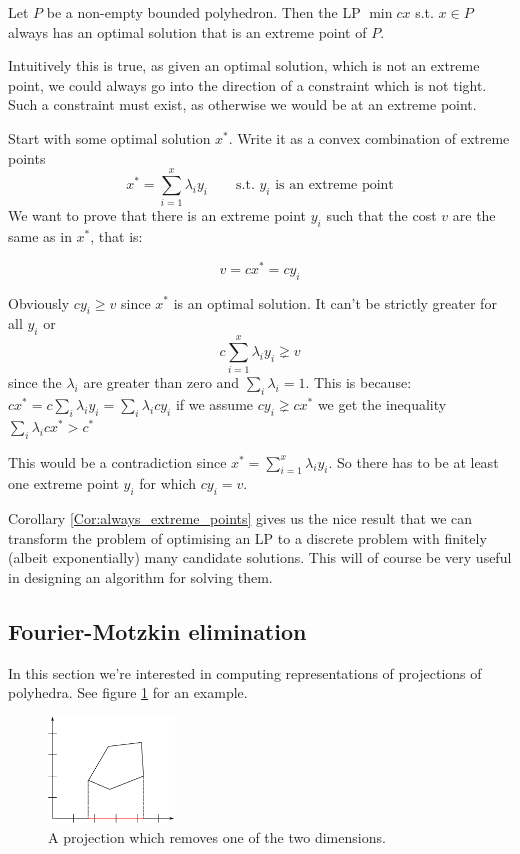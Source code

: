 \begin{cor}\label{Cor:always_extreme_points} Let $P$ be a non-empty bounded polyhedron. Then the LP $\min cx$ s.t. $x\in P$ always has an optimal solution that is an extreme point of $P$.
\end{cor}

Intuitively this is true, as given an optimal solution, which is not an extreme point, we could always go into the direction of a constraint which is not tight. Such a constraint must exist, as otherwise we would be at an extreme point. 

\begin{pr} %
Start with some optimal solution $x^*$. Write it as a convex combination of extreme points 
\[x^* = \sum_{i=1}^x \lambda_i y_i \qquad \text{s.t. } y_i \text{ is an extreme point}\]
We want to prove that there is an extreme point $y_i$ such that the cost $v$ are the same as in $x^{*}$, that is:

\[v = cx^* = cy_i\]

Obviously $cy_i\geq v$ since $x^*$ is an optimal solution. It can't be strictly greater for all $y_i$ or 
\[c\sum_{i=1}^x \lambda_i y_i \gneq v\]
since the $\lambda_i$ are greater than zero and $\sum_i \lambda_i =1$. This is because: $cx^* = c\sum_{i} \lambda_i y_i =\sum_i \lambda_i cy_i$ if we assume $cy_i\gneq cx^*$ we get the inequality $\sum_i \lambda_i cx^*> c^* $

This would be a contradiction since $x^*=\sum_{i=1}^x \lambda_i y_i$. So there has to be at least one extreme point $y_i$ for which $cy_i=v$.
\end{pr}

Corollary \ref{Cor:always_extreme_points} gives us the nice result that we can transform the problem of optimising an LP to a discrete problem with finitely (albeit exponentially) many candidate solutions. This will of course be very useful in designing an algorithm for solving them.

\subsection{Fourier-Motzkin elimination}\label{Sec:FourierMotzkin}

In this section we're interested in computing representations of projections of polyhedra. See figure \ref{Fig:polyhedron_proj} for an example.

\begin{figure}[hbt]
\begin{center}
\includegraphics[width=0.3\textwidth]{./images/polyhedron_proj.pdf}
\end{center}
\caption{A projection which removes one of the two dimensions.}
\label{Fig:polyhedron_proj}
\end{figure}

